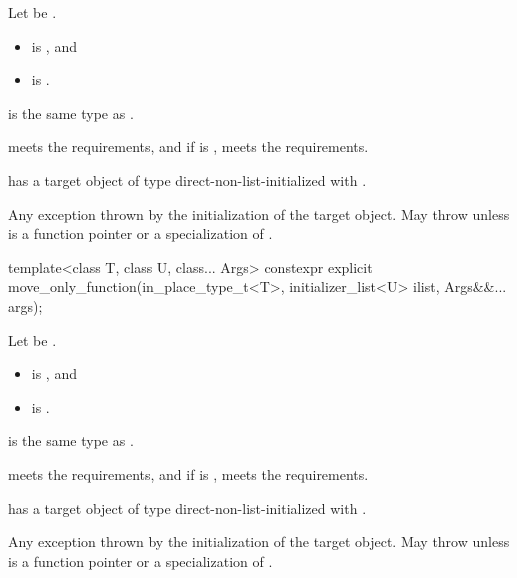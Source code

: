 \begin{itemdescr}
\pnum
Let  be .

\pnum
\constraints
\begin{itemize}
\item
{} is , and
\item
{} is .
\end{itemize}

\pnum
\mandates
{} is the same type as .

\pnum
\expects
{} meets the  requirements, and
if  is ,
 meets the  requirements.

\pnum
\ensures
{} has a target object of type 
direct-non-list-initialized with .

\pnum
\throws
Any exception thrown by the initialization of the target object.
May throw  unless  is
a function pointer or a specialization of .
\end{itemdescr}

%
\begin{itemdecl}
template<class T, class U, class... Args>
  constexpr explicit move_only_function(in_place_type_t<T>, initializer_list<U> ilist, Args&&... args);
\end{itemdecl}

\begin{itemdescr}
\pnum
Let  be .

\pnum
\constraints
\begin{itemize}
\item
{} is
, and
\item
{} is .
\end{itemize}

\pnum
\mandates
{} is the same type as .

\pnum
\expects
{} meets the  requirements, and
if  is ,
 meets the  requirements.

\pnum
\ensures
{} has a target object of type 
direct-non-list-initialized with
.

\pnum
\throws
Any exception thrown by the initialization of the target object.
May throw  unless  is
a function pointer or a specialization of .
\end{itemdescr}

